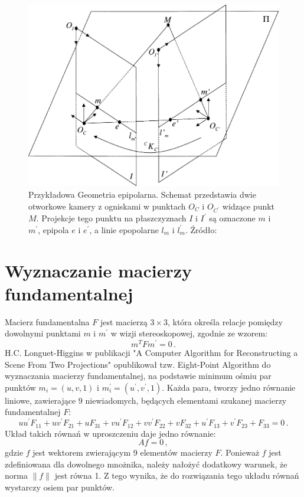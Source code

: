 \begin{figure}[h!] \centering
  \includegraphics[width=1\textwidth]{images/epipolar_geometry.png}
  \caption{Przykładowa Geometria epipolarna. Schemat przedstawia dwie otworkowe
  kamery z ogniskami w punktach $O_C$ i $O_{C^\prime}$ widzące punkt $M$.
  Projekcje tego punktu na płaszczyznach $I$ i $I^\prime$ są oznaczone $m$ i
  $m^\prime$, epipola $e$ i $e^\prime$, a linie epopolarne $l_{m}$ i
  $l_m^\prime$. Źródło: \cite{fm_overview} } \end{figure}

\section{Wyznaczanie macierzy fundamentalnej}

Macierz fundamentalna $F$ jest macierzą $3 \times 3$, która określa relacje
pomiędzy dowolnymi punktami $m$ i $m^\prime$ w wizji stereoskopowej, zgodnie ze
wzorem: $$m^TFm^\prime = 0\,.$$ H.C. Longuet-Higgins w publikacji "A Computer
Algorithm for Reconstructing a Scene From Two Projections" \cite{eight_point}
opublikował tzw.  Eight-Point Algorithm do wyznaczania macierzy fundamentalnej,
na podstawie minimum ośmiu par punktów $m_i=(u,v,1)$ i
$m_i^\prime=(u^\prime,v^\prime,1)$.  Każda para, tworzy jedno równanie liniowe,
zawierające 9 niewiadomych, będących elementami szukanej macierzy fundamentalnej
$F$: $$uu^\prime F_{11} + uv^\prime F_{21} + uF_{31} + vu^\prime F_{12} +
vv^\prime F_{22} + vF_{32} + u^\prime F_{13} + v^\prime F_{23} + F_{33} =
0\,.$$ Układ takich równań w uproszczeniu daje jedno równanie: $$Af=0\,,$$
gdzie $f$ jest wektorem zwierającym 9 elementów macierzy $F$. Ponieważ $f$ jest
zdefiniowana dla dowolnego mnożnika, należy nałożyć dodatkowy warunek, że norma
$\|f\|$ jest równa 1. Z tego wynika, że do rozwiązania tego układu równań
wystarczy osiem par punktów.

